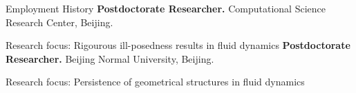 \begin{rubric}{Employment History}
\entry*[2021 -- 2023]%
	\textbf{Postdoctorate Researcher.} Computational Science Research Center, Beijing. 

	 Research focus: Rigourous ill-posedness results in fluid dynamics
%
%
\entry*[2019 -- 2021]%
	\textbf{Postdoctorate Researcher.} Beijing Normal University, Beijing. 

	Research focus: Persistence of geometrical structures in fluid dynamics
\end{rubric}
